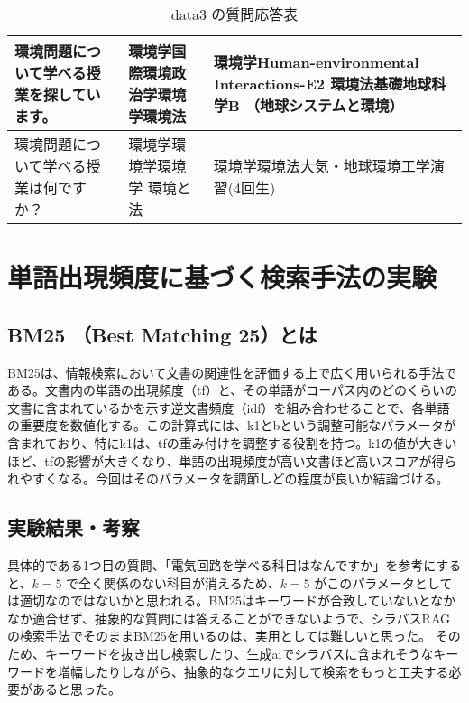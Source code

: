 \begin{table}[h!]
\begin{tabular}{|p{5cm}|p{5cm}|p{5cm}|}
        環境問題について学べる授業を探しています。 & 環境学国際環境政治学環境学環境法 & 環境学Human-environmental Interactions-E2 環境法基礎地球科学B （地球システムと環境） \\ \hline
        環境問題について学べる授業は何ですか？ & 環境学環境学環境学 環境と法 & 環境学環境法大気・地球環境工学演習(4回生) \\ \hline
    \end{tabular}
    \caption{data3 の質問応答表}
\end{table}



\section{単語出現頻度に基づく検索手法の実験}

\subsection{BM25 （Best Matching 25）とは}
BM25は、情報検索において文書の関連性を評価する上で広く用いられる手法である。文書内の単語の出現頻度（tf）と、その単語がコーパス内のどのくらいの文書に含まれているかを示す逆文書頻度（idf）を組み合わせることで、各単語の重要度を数値化する。この計算式には、k1とbという調整可能なパラメータが含まれており、特にk1は、tfの重み付けを調整する役割を持つ。k1の値が大きいほど、tfの影響が大きくなり、単語の出現頻度が高い文書ほど高いスコアが得られやすくなる。今回はそのパラメータを調節しどの程度が良いか結論づける。

\subsection{実験結果・考察}
具体的である1つ目の質問、「電気回路を学べる科目はなんですか」を参考にすると、\( k = 5 \) で全く関係のない科目が消えるため、\( k = 5 \) がこのパラメータとしては適切なのではないかと思われる。BM25はキーワードが合致していないとなかなか適合せず、抽象的な質問には答えることができないようで、シラバスRAGの検索手法でそのままBM25を用いるのは、実用としては難しいと思った。
そのため、キーワードを抜き出し検索したり、生成aiでシラバスに含まれそうなキーワードを増幅したりしながら、抽象的なクエリに対して検索をもっと工夫する必要があると思った。


